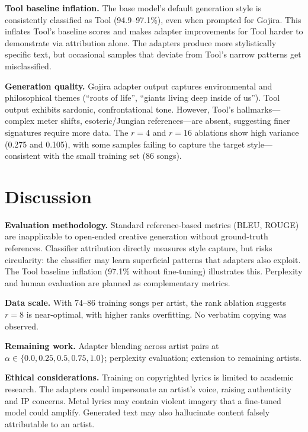 \documentclass[runningheads]{llncs}
\begin{document}
\textbf{Tool baseline inflation.}
The base model's default generation style is consistently classified as Tool (94.9--97.1\%), even when prompted for Gojira. This inflates Tool's baseline scores and makes adapter improvements for Tool harder to demonstrate via attribution alone. The adapters produce more stylistically specific text, but occasional samples that deviate from Tool's narrow patterns get misclassified.

\textbf{Generation quality.}
Gojira adapter output captures environmental and philosophical themes (``roots of life'', ``giants living deep inside of us''). Tool output exhibits sardonic, confrontational tone. However, Tool's hallmarks---complex meter shifts, esoteric/Jungian references---are absent, suggesting finer signatures require more data. The $r{=}4$ and $r{=}16$ ablations show high variance (0.275 and 0.105), with some samples failing to capture the target style---consistent with the small training set (86 songs).

\section{Discussion}
\label{sec:discussion}

\textbf{Evaluation methodology.}
Standard reference-based metrics (BLEU, ROUGE) are inapplicable to open-ended creative generation without ground-truth references. Classifier attribution directly measures style capture, but risks circularity: the classifier may learn superficial patterns that adapters also exploit. The Tool baseline inflation (97.1\% without fine-tuning) illustrates this. Perplexity and human evaluation are planned as complementary metrics.

\textbf{Data scale.}
With 74--86 training songs per artist, the rank ablation suggests $r{=}8$ is near-optimal, with higher ranks overfitting. No verbatim copying was observed.

\textbf{Remaining work.}
Adapter blending across artist pairs at $\alpha \in \{0.0, 0.25, 0.5, 0.75, 1.0\}$; perplexity evaluation; extension to remaining artists.

\textbf{Ethical considerations.}
Training on copyrighted lyrics is limited to academic research. The adapters could impersonate an artist's voice, raising authenticity and IP concerns. Metal lyrics may contain violent imagery that a fine-tuned model could amplify. Generated text may also hallucinate content falsely attributable to an artist.
\end{document}
